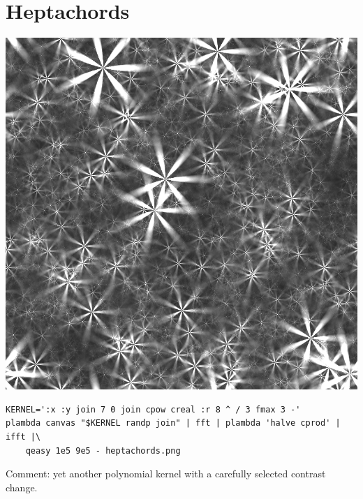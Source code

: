 \section{Heptachords}
\includegraphics{heptachords.png}
\begin{verbatim}
KERNEL=':x :y join 7 0 join cpow creal :r 8 ^ / 3 fmax 3 -'
plambda canvas "$KERNEL randp join" | fft | plambda 'halve cprod' | ifft |\
	qeasy 1e5 9e5 - heptachords.png
\end{verbatim}
Comment: yet another polynomial kernel with a carefully selected contrast
change.


